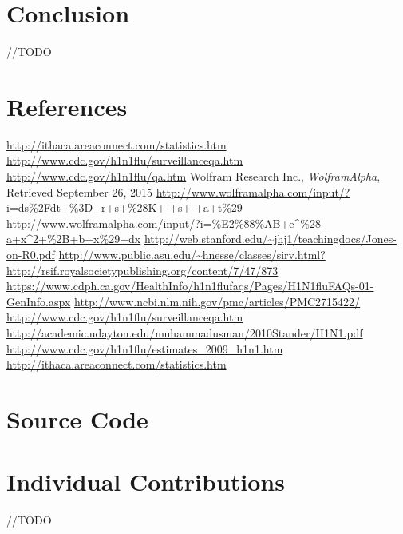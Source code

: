 \documentclass[titlepage]{article}
\begin{document}
\section{Conclusion}
	//TODO
\section{References}
	\begin{thebibliography}{9}
		\url{http://ithaca.areaconnect.com/statistics.htm}
		\url{http://www.cdc.gov/h1n1flu/surveillanceqa.htm}
		\url{http://www.cdc.gov/h1n1flu/qa.htm}
		Wolfram Research Inc.,
		\emph{WolframAlpha},
		Retrieved September 26, 2015
		\url{http://www.wolframalpha.com/input/?i=ds%2Fdt+%3D+r+s+%28K+-+s+-+a+t%29}
		\url{http://www.wolframalpha.com/input/?i=%E2%88%AB+e^%28-a+x^2+%2B+b+x%29+dx}
		\url{http://web.stanford.edu/~jhj1/teachingdocs/Jones-on-R0.pdf}
		\url{http://www.public.asu.edu/~hnesse/classes/sirv.html?}
		\url{http://rsif.royalsocietypublishing.org/content/7/47/873}
		\url{https://www.cdph.ca.gov/HealthInfo/h1n1flufaqs/Pages/H1N1fluFAQs-01-GenInfo.aspx}
		\url{http://www.ncbi.nlm.nih.gov/pmc/articles/PMC2715422/}
		\url{http://www.cdc.gov/h1n1flu/surveillanceqa.htm}
        \url{http://academic.udayton.edu/muhammadusman/2010Stander/H1N1.pdf}
        \url{http://www.cdc.gov/h1n1flu/estimates_2009_h1n1.htm}
        \url{http://ithaca.areaconnect.com/statistics.htm}
	\end{thebibliography}

\section{Source Code}
	
	
	
	
	
	
	

\section{Individual Contributions}
	//TODO
\end{document}
